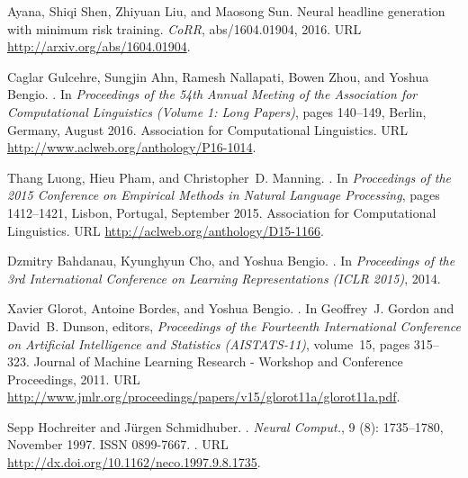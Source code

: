 \documentclass[11pt]{article}
\begin{document}
\begin{thebibliography}{23}
Ayana, Shiqi Shen, Zhiyuan Liu, and Maosong Sun.
\newblock Neural headline generation with minimum risk training.
\newblock \emph{CoRR}, abs/1604.01904, 2016.
\newblock URL \url{http://arxiv.org/abs/1604.01904}.

Caglar Gulcehre, Sungjin Ahn, Ramesh Nallapati, Bowen Zhou, and Yoshua Bengio.
.
\newblock In \emph{Proceedings of the 54th Annual Meeting of the Association
  for Computational Linguistics (Volume 1: Long Papers)}, pages 140--149,
  Berlin, Germany, August 2016. Association for Computational Linguistics.
\newblock URL \url{http://www.aclweb.org/anthology/P16-1014}.

Thang Luong, Hieu Pham, and Christopher~D. Manning.
.
\newblock In \emph{Proceedings of the 2015 Conference on Empirical Methods in
  Natural Language Processing}, pages 1412--1421, Lisbon, Portugal, September
  2015. Association for Computational Linguistics.
\newblock URL \url{http://aclweb.org/anthology/D15-1166}.

Dzmitry Bahdanau, Kyunghyun Cho, and Yoshua Bengio.
.
\newblock In \emph{Proceedings of the 3rd International Conference on Learning
  Representations (ICLR 2015)}, 2014.

Xavier Glorot, Antoine Bordes, and Yoshua Bengio.
.
\newblock In Geoffrey~J. Gordon and David~B. Dunson, editors, \emph{Proceedings
  of the Fourteenth International Conference on Artificial Intelligence and
  Statistics (AISTATS-11)}, volume~15, pages 315--323. Journal of Machine
  Learning Research - Workshop and Conference Proceedings, 2011.
\newblock URL
  \url{http://www.jmlr.org/proceedings/papers/v15/glorot11a/glorot11a.pdf}.

Sepp Hochreiter and J\"{u}rgen Schmidhuber.
.
\newblock \emph{Neural Comput.}, 9 (8): 1735--1780, November
  1997.
\newblock ISSN 0899-7667.
\newblock {}.
\newblock URL \url{http://dx.doi.org/10.1162/neco.1997.9.8.1735}.


\end{thebibliography}
\end{document}
